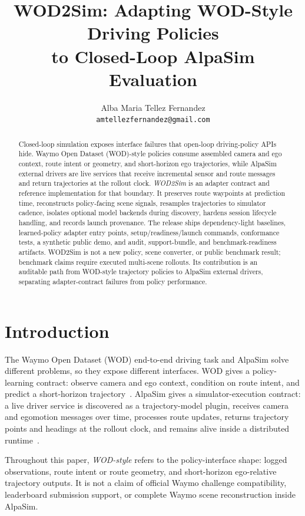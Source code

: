 \documentclass{article}
\title{WOD2Sim: Adapting WOD-Style Driving Policies\\
to Closed-Loop AlpaSim Evaluation}
\author{
  Alba Maria Tellez Fernandez\\
  \texttt{amtellezfernandez@gmail.com}
}
\begin{document}
\maketitle

\begin{abstract}
Closed-loop simulation exposes interface failures that open-loop driving-policy APIs hide.
Waymo Open Dataset (WOD)-style policies consume assembled camera and ego context, route
intent or geometry, and short-horizon ego trajectories, while AlpaSim external drivers are
live services that receive incremental sensor and route messages and return trajectories
at the rollout clock. \emph{WOD2Sim} is an adapter contract and reference implementation
for that boundary. It preserves route waypoints at prediction time, reconstructs
policy-facing scene signals, resamples trajectories to simulator cadence, isolates
optional model backends during discovery, hardens session lifecycle handling, and records
launch provenance. The release ships dependency-light baselines, learned-policy adapter
entry points, setup/readiness/launch commands, conformance tests, a synthetic public demo,
and audit, support-bundle, and benchmark-readiness artifacts. WOD2Sim is not a new policy,
scene converter, or public benchmark result; benchmark claims require executed multi-scene
rollouts. Its contribution is an auditable path from WOD-style trajectory policies to
AlpaSim external drivers, separating adapter-contract failures from policy performance.
\end{abstract}

\section{Introduction}

The Waymo Open Dataset (WOD) end-to-end driving task and AlpaSim solve different
problems, so they expose different interfaces. WOD gives a policy-learning contract:
observe camera and ego context, condition on route intent, and predict a short-horizon
trajectory~\citep{sun2020scalability}. AlpaSim gives a simulator-execution contract: a
live driver service is discovered as a trajectory-model plugin, receives camera and
egomotion messages over time, processes route updates, returns trajectory points and
headings at the rollout clock, and remains alive inside a distributed runtime~\citep{alpasim2026}.

Throughout this paper, \emph{WOD-style} refers to the policy-interface shape:
logged observations, route intent or route geometry, and short-horizon ego-relative
trajectory outputs. It is not a claim of official Waymo challenge compatibility,
leaderboard submission support, or complete Waymo scene reconstruction inside AlpaSim.
\end{document}
